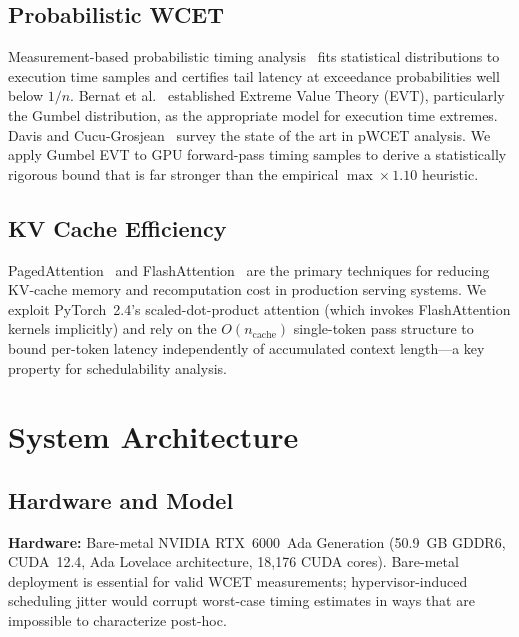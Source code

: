 \documentclass[conference]{IEEEtran}
\begin{document}
\subsection{Probabilistic WCET}

Measurement-based probabilistic timing analysis~\cite{cucu2012measurement}
fits statistical distributions to execution time samples and certifies
tail latency at exceedance probabilities well below $1/n$.
Bernat et al.~\cite{bernat2002wcet} established Extreme Value Theory
(EVT), particularly the Gumbel distribution, as the appropriate model
for execution time extremes.
Davis and Cucu-Grosjean~\cite{davis2013quantifying} survey the state of
the art in pWCET analysis.
We apply Gumbel EVT to GPU forward-pass timing samples to derive
a statistically rigorous bound that is far stronger than the empirical
$\max \times 1.10$ heuristic.

\subsection{KV Cache Efficiency}

PagedAttention~\cite{kwon2023efficient} and FlashAttention~\cite{dao2022flashattention,
dao2023flashattention2} are the primary techniques for reducing KV-cache
memory and recomputation cost in production serving systems.
We exploit PyTorch~2.4's scaled-dot-product attention (which invokes
FlashAttention kernels implicitly) and rely on the $O(n_{\text{cache}})$
single-token pass structure to bound per-token latency
independently of accumulated context length---a key property for
schedulability analysis.

\section{System Architecture}

\subsection{Hardware and Model}

\textbf{Hardware:}
Bare-metal NVIDIA RTX~6000~Ada Generation (50.9~GB GDDR6, CUDA~12.4,
Ada Lovelace architecture, 18{,}176 CUDA cores).
Bare-metal deployment is essential for valid WCET measurements;
hypervisor-induced scheduling jitter would corrupt worst-case timing
estimates in ways that are impossible to characterize post-hoc.
\end{document}
